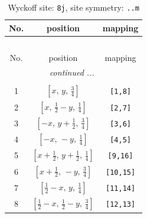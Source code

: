 \documentclass[fleqn,8pt]{jsarticle}
\begin{document}
\begin{longtable}{ccc}
\caption{Wyckoff site: {\tt 8j}, site symmetry: {\tt ..m}}
 \\
 \hline \hline
No. & position & mapping \\ \hline \endfirsthead

\multicolumn{2}{l}{\tablename\ \thetable{}} \\
 \hline \hline
No. & position & mapping \\ \hline \endhead

 \hline \hline
\multicolumn{2}{r}{\footnotesize\it continued ...} \\ \endfoot

 \hline \hline
\multicolumn{2}{r}{} \\ \endlastfoot

1 & $\left[ x,\, y,\, \frac{3}{4} \right]$ & {\tt [1,8]} \\ \hline
2 & $\left[ x,\, \frac{1}{2} - y,\, \frac{1}{4} \right]$ & {\tt [2,7]} \\ \hline
3 & $\left[ - x,\, y + \frac{1}{2},\, \frac{3}{4} \right]$ & {\tt [3,6]} \\ \hline
4 & $\left[ - x,\, - y,\, \frac{1}{4} \right]$ & {\tt [4,5]} \\ \hline
5 & $\left[ x + \frac{1}{2},\, y + \frac{1}{2},\, \frac{1}{4} \right]$ & {\tt [9,16]} \\ \hline
6 & $\left[ x + \frac{1}{2},\, - y,\, \frac{3}{4} \right]$ & {\tt [10,15]} \\ \hline
7 & $\left[ \frac{1}{2} - x,\, y,\, \frac{1}{4} \right]$ & {\tt [11,14]} \\ \hline
8 & $\left[ \frac{1}{2} - x,\, \frac{1}{2} - y,\, \frac{3}{4} \right]$ & {\tt [12,13]} \\
\end{longtable}
\renewcommand{\arraystretch}{1.2}
\end{document}

